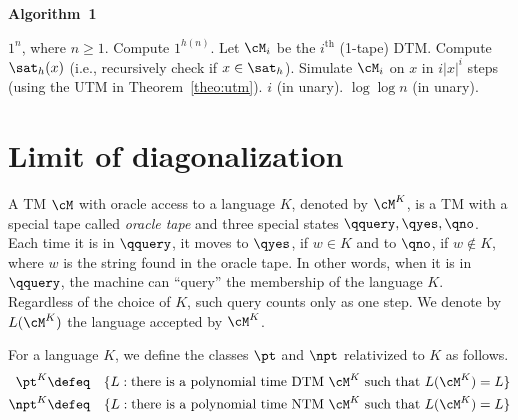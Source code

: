 \documentclass[11pt, a4paper]{article}
\begin{document}
\begin{algorithm}
\label{alg:ladner}
\caption{\bf Algorithm~1}
\begin{algorithmic}[1]
\REQUIRE
$1^n$, where $n\geq 1$.
\ENSURE
Compute $1^{h(n)}$.
\STATE
Let $\cM_i$ be the $i^{\text{th}}$ (1-tape) DTM.
\STATE
Compute $\sat_h(x)$ (i.e., recursively check if $x\in \sat_h$).
\STATE
Simulate $\cM_i$ on $x$ in $i|x|^i$ steps (using the UTM in Theorem~\ref{theo:utm}).
\ENDFOR
{}
\RETURN $i$ (in unary).
\ENDIF
\ENDFOR
\RETURN $\log\log n$ (in unary).
\end{algorithmic}
\end{algorithm}






\section{Limit of diagonalization}

A TM $\cM$ with oracle access to a language $K$, denoted by $\cM^K$, 
is a TM with a special tape called {\em oracle tape} and three special states $\qquery,\qyes,\qno$.
Each time it is in $\qquery$,
it moves to $\qyes$, if $w\in K$
and to $\qno$, if $w\notin K$, where $w$ is the string found in the oracle tape.
In other words, when it is in $\qquery$, the machine can ``query'' the membership of the language $K$. 
Regardless of the choice of $K$, such query counts only as one step.
We denote by $L(\cM^K)$ the language accepted by $\cM^K$.

For a language $K$, we define the classes $\pt$ and $\npt$ relativized to $K$ as follows.
\begin{eqnarray*}
\pt^K &\defeq & \{L : \text{there is a polynomial time DTM}\ \cM^K \ \text{such that} \  L(\cM^K)=L\}
\\
\npt^K & \defeq & \{L : \text{there is a polynomial time NTM}\ \cM^K \ \text{such that} \  L(\cM^K)=L\}
\end{eqnarray*}
\end{document}
